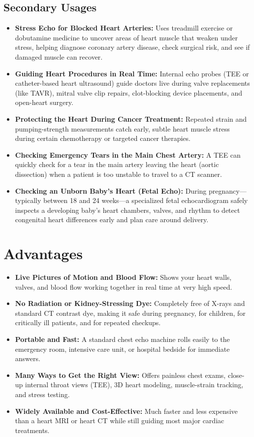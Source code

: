 \subsection{Secondary Usages}
\begin{itemize}
\item \textbf{Stress Echo for Blocked Heart Arteries:} Uses treadmill exercise or dobutamine medicine to uncover areas of heart muscle that weaken under stress, helping diagnose coronary artery disease, check surgical risk, and see if damaged muscle can recover.
\item \textbf{Guiding Heart Procedures in Real Time:} Internal echo probes (TEE or catheter-based heart ultrasound) guide doctors live during valve replacements (like TAVR), mitral valve clip repairs, clot-blocking device placements, and open-heart surgery.
\item \textbf{Protecting the Heart During Cancer Treatment:} Repeated strain and pumping-strength measurements catch early, subtle heart muscle stress during certain chemotherapy or targeted cancer therapies.
\item \textbf{Checking Emergency Tears in the Main Chest Artery:} A TEE can quickly check for a tear in the main artery leaving the heart (aortic dissection) when a patient is too unstable to travel to a CT scanner.
\item \textbf{Checking an Unborn Baby's Heart (Fetal Echo):} During pregnancy---typically between 18 and 24 weeks---a specialized fetal echocardiogram safely inspects a developing baby's heart chambers, valves, and rhythm to detect congenital heart differences early and plan care around delivery.
\end{itemize}

\section{Advantages}
\begin{itemize}
\item \textbf{Live Pictures of Motion and Blood Flow:} Shows your heart walls, valves, and blood flow working together in real time at very high speed.
\item \textbf{No Radiation or Kidney-Stressing Dye:} Completely free of X-rays and standard CT contrast dye, making it safe during pregnancy, for children, for critically ill patients, and for repeated checkups.
\item \textbf{Portable and Fast:} A standard chest echo machine rolls easily to the emergency room, intensive care unit, or hospital bedside for immediate answers.
\item \textbf{Many Ways to Get the Right View:} Offers painless chest exams, close-up internal throat views (TEE), 3D heart modeling, muscle-strain tracking, and stress testing.
\item \textbf{Widely Available and Cost-Effective:} Much faster and less expensive than a heart MRI or heart CT while still guiding most major cardiac treatments.
\end{itemize}

